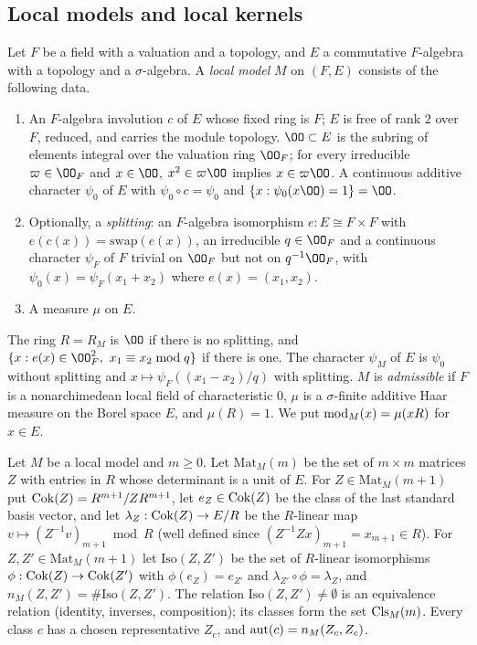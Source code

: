 \subsection{Local models and local kernels}\label{pf:thmS-leaves:ss:local}

\begin{definition}\label{pf:thmS-leaves:def:model}
Let $F$ be a field with a valuation and a topology, and $E$ a commutative $F$-algebra with a topology and a
$\sigma$-algebra. A \emph{local model} $M$ on $(F,E)$ consists of the following data.
\begin{enumerate}
\item An $F$-algebra involution $c$ of $E$ whose fixed ring is $F$; $E$ is free of rank $2$ over $F$,
reduced, and carries the module topology. $\OO\subset E$ is the subring of elements integral over the
valuation ring $\OO_F$; for every irreducible $\varpi\in\OO_F$ and $x\in\OO$, $x^2\in\varpi\OO$ implies
$x\in\varpi\OO$. A continuous additive character $\psi_0$ of $E$ with $\psi_0\circ c=\psi_0$ and
$\{x:\psi_0(x\OO)=1\}=\OO$.
\item Optionally, a \emph{splitting}: an $F$-algebra isomorphism $e:E\cong F\times F$ with
$e(c(x))=\mathrm{swap}(e(x))$, an irreducible $q\in\OO_F$ and a continuous character $\psi_F$ of $F$ trivial on
$\OO_F$ but not on $q^{-1}\OO_F$, with $\psi_0(x)=\psi_F(x_1+x_2)$ where $e(x)=(x_1,x_2)$.
\item A measure $\mu$ on $E$.
\end{enumerate}
The ring $R=R_M$ is $\OO$ if there is no splitting, and $\{x:e(x)\in\OO_F^2,\ x_1\equiv x_2\bmod q\}$ if there is
one. The character $\psi_M$ of $E$ is $\psi_0$ without splitting and $x\mapsto\psi_F((x_1-x_2)/q)$ with
splitting. $M$ is \emph{admissible} if $F$ is a nonarchimedean local field of characteristic $0$, $\mu$ is a
$\sigma$-finite additive Haar measure on the Borel space $E$, and $\mu(R)=1$. We put
$\mathrm{mod}_M(x)=\mu(xR)$ for $x\in E$.
\end{definition}

\begin{definition}\label{pf:thmS-leaves:def:cok}
Let $M$ be a local model and $m\ge0$. Let $\mathrm{Mat}_M(m)$ be the set of $m\times m$ matrices $Z$ with entries in
$R$ whose determinant is a unit of $E$. For $Z\in\mathrm{Mat}_M(m+1)$ put $\mathrm{Cok}(Z)=R^{m+1}/ZR^{m+1}$, let
$e_Z\in\mathrm{Cok}(Z)$ be the class of the last standard basis vector, and let
$\lambda_Z:\mathrm{Cok}(Z)\to E/R$ be the $R$-linear map $v\mapsto(Z^{-1}v)_{m+1}\bmod R$ (well defined since
$(Z^{-1}Zx)_{m+1}=x_{m+1}\in R$). For $Z,Z'\in\mathrm{Mat}_M(m+1)$ let $\mathrm{Iso}(Z,Z')$ be the set of $R$-linear
isomorphisms $\phi:\mathrm{Cok}(Z)\to\mathrm{Cok}(Z')$ with $\phi(e_Z)=e_{Z'}$ and $\lambda_{Z'}\circ\phi=\lambda_Z$,
and $n_M(Z,Z')=\#\mathrm{Iso}(Z,Z')$. The relation $\mathrm{Iso}(Z,Z')\ne\emptyset$ is an equivalence relation
(identity, inverses, composition); its classes form the set $\mathrm{Cls}_M(m)$. Every class $c$ has a chosen
representative $Z_c$, and $\mathrm{aut}(c)=n_M(Z_c,Z_c)$.
\end{definition}

